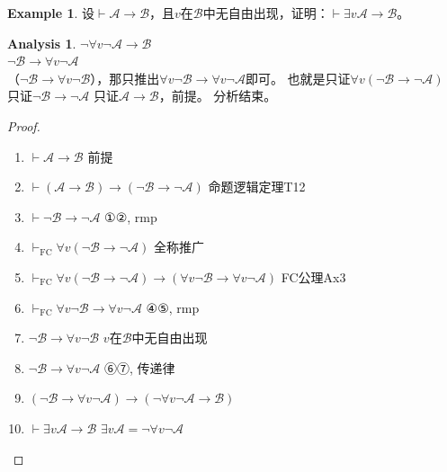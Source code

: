 \documentclass[oneside]{book}
\theoremstyle{definition}
\newtheorem{example}{Example}[section]
\newtheorem*{analysis}{Analysis}
\begin{document}
\begin{example}
	设\( \vdash \mathcal{A} \to \mathcal{B} \)，且\( v \)在\( \mathcal{B} \)中无自由出现，证明：\( \vdash \exists v \mathcal{A} \to \mathcal{B} \)。
\end{example}
\begin{analysis}
	\(\neg \forall v \neg \mathcal{A} \to \mathcal{B}\)\\
	\(\neg \mathcal{B} \to \forall v \neg \mathcal{A}\)\\
	（\(\neg \mathcal{B} \to \forall v \neg \mathcal{B}\)），那只推出\(\forall v \neg \mathcal{B} \to \forall v \neg \mathcal{A}\)即可。
	也就是只证\(\forall v (\neg \mathcal{B} \to \neg \mathcal{A})\)
	只证\(\neg \mathcal{B} \to \neg \mathcal{A}\)
	只证\(\mathcal{A} \to \mathcal{B}\)，前提。
	分析结束。
\end{analysis}
\begin{proof}
	\begin{enumerate}
		\item \( \vdash \mathcal{A} \to \mathcal{B} \) \hfill 前提
		\item \( \vdash (\mathcal{A} \to \mathcal{B}) \to (\neg \mathcal{B} \to \neg \mathcal{A}) \) \hfill 命题逻辑定理T12
		\item \( \vdash \neg \mathcal{B} \to \neg \mathcal{A} \) \hfill ①②, rmp
		\item \( \vdash_{\text{FC}} \forall v (\neg \mathcal{B} \to \neg \mathcal{A}) \) \hfill 全称推广
		\item \( \vdash_{\text{FC}} \forall v (\neg \mathcal{B} \to \neg \mathcal{A}) \to (\forall v \neg \mathcal{B} \to \forall v \neg \mathcal{A}) \) \hfill FC公理Ax3
		\item \( \vdash_{\text{FC}} \forall v \neg \mathcal{B} \to \forall v \neg \mathcal{A} \) \hfill ④⑤, rmp
		\item \( \neg \mathcal{B} \to \forall v \neg \mathcal{B} \) \hfill \( v \)在\( \mathcal{B} \)中无自由出现
		\item \( \neg \mathcal{B} \to \forall v \neg \mathcal{A} \) \hfill ⑥⑦, 传递律
		\item \( (\neg \mathcal{B} \to \forall v \neg \mathcal{A}) \to (\neg \forall v \neg \mathcal{A} \to \mathcal{B}) \) 
		\item \( \vdash \exists v \mathcal{A} \to \mathcal{B} \) \hfill \( \exists v \mathcal{A} = \neg \forall v \neg \mathcal{A} \)
	\end{enumerate}
\end{proof}
\end{document}
